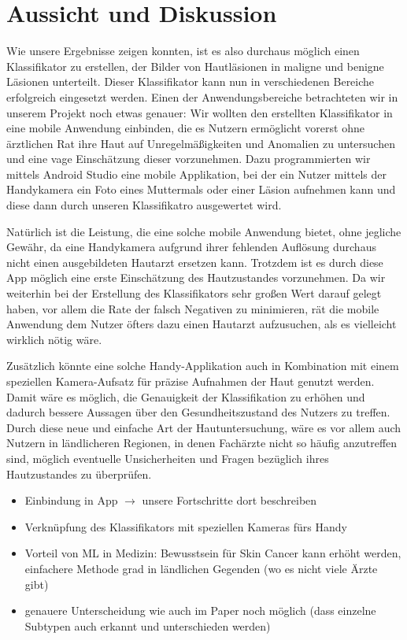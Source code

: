 \section{Aussicht und Diskussion}

Wie unsere Ergebnisse zeigen konnten, ist es also durchaus möglich einen Klassifikator zu erstellen, der Bilder von Hautläsionen in maligne und benigne Läsionen unterteilt. Dieser Klassifikator kann nun in verschiedenen Bereiche erfolgreich eingesetzt werden. Einen der Anwendungsbereiche betrachteten wir in unserem Projekt noch etwas genauer: Wir wollten den erstellten Klassifikator in eine mobile Anwendung einbinden, die es Nutzern ermöglicht vorerst ohne ärztlichen Rat ihre Haut auf Unregelmäßigkeiten und Anomalien zu untersuchen und eine vage Einschätzung dieser vorzunehmen. Dazu programmierten wir mittels Android Studio eine mobile Applikation, bei der ein Nutzer mittels der Handykamera ein Foto eines Muttermals oder einer Läsion aufnehmen kann und diese dann durch unseren Klassifikatro ausgewertet wird. 

Natürlich ist die Leistung, die eine solche mobile Anwendung bietet, ohne jegliche Gewähr, da eine Handykamera aufgrund ihrer fehlenden Auflösung durchaus nicht einen ausgebildeten Hautarzt ersetzen kann. Trotzdem ist es durch diese App möglich eine erste Einschätzung des Hautzustandes vorzunehmen. Da wir weiterhin bei der Erstellung des Klassifikators sehr großen Wert darauf gelegt haben, vor allem die Rate der falsch Negativen zu minimieren, rät die mobile Anwendung dem Nutzer öfters dazu einen Hautarzt aufzusuchen, als es vielleicht wirklich nötig wäre. 

Zusätzlich könnte eine solche Handy-Applikation auch in Kombination mit einem speziellen Kamera-Aufsatz für präzise Aufnahmen der Haut genutzt werden. Damit wäre es möglich, die Genauigkeit der Klassifikation zu erhöhen und dadurch bessere Aussagen über den Gesundheitszustand des Nutzers zu treffen. Durch diese neue und einfache Art der Hautuntersuchung, wäre es vor allem auch Nutzern in ländlicheren Regionen, in denen Fachärzte nicht so häufig anzutreffen sind, möglich eventuelle Unsicherheiten und Fragen bezüglich ihres Hautzustandes zu überprüfen. 

\color{red}
\begin{itemize}
	\item Einbindung in App $\rightarrow$ unsere Fortschritte dort beschreiben
	\item Verknüpfung des Klassifikators mit speziellen Kameras fürs Handy
	\item Vorteil von ML in Medizin: Bewusstsein für Skin Cancer kann erhöht werden, einfachere Methode grad in ländlichen Gegenden (wo es nicht viele Ärzte gibt)
	\item genauere Unterscheidung wie auch im Paper noch möglich (dass einzelne Subtypen auch erkannt und unterschieden werden)

\end{itemize}
\color{black}